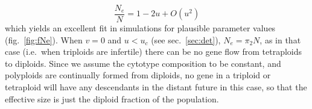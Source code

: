 \[\frac{N_e}{N} = 1 - 2u + O(u^2)\] which yields an excellent fit in
simulations for plausible parameter values (fig.~\ref{fig:fNe}). When
\(v=0\) and \(u < u_c\) (see sec.~\ref{sec:det}), \(N_e = \pi_2N\), as
in that case (i.e.~when triploids are infertile) there can be no gene
flow from tetraploids to diploids. Since we assume the cytotype
composition to be constant, and polyploids are continually formed from
diploids, no gene in a triploid or tetraploid will have any descendants
in the distant future in this case, so that the effective size is just
the diploid fraction of the population.
